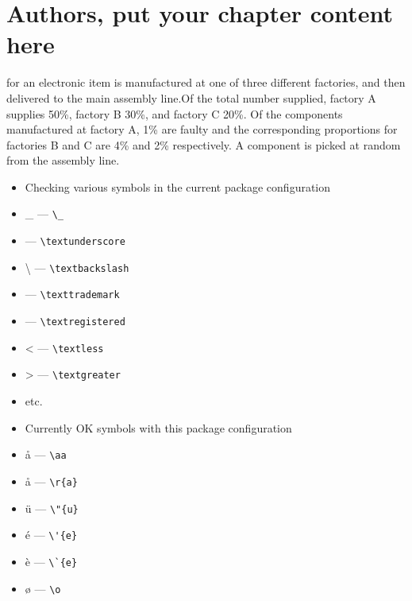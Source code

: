 %
%


\chapter[Authors, put your chapter content here]{Authors, put your chapter content here}


 for an electronic item is
manufactured at one of three different factories, and then delivered to
the main assembly line.Of the total number supplied, factory A supplies
50\%, factory B 30\%, and factory C 20\%. Of the components
manufactured at factory A, 1\% are faulty and the corresponding
proportions for factories B and C are 4\% and 2\% respectively. A
component is picked at random from the assembly line. 

\begin{itemize}

	\item Checking various symbols in the current package configuration
	\item \_ --- \verb|\_|
	\item \textunderscore{} --- \verb|\textunderscore|
	\item \textbackslash{} --- \verb|\textbackslash|
	\item \texttrademark{} --- \verb|\texttrademark|
	\item \textregistered{} --- \verb|\textregistered|
	\item \textless{} --- \verb|\textless|
	\item \textgreater{} --- \verb|\textgreater|
	\item etc.

	\item Currently OK symbols with this package configuration	
	\item \aa{} --- \verb|\aa|
	\item \r{a} --- \verb|\r{a}|
	\item \"{u} --- \verb|\"{u}|
	\item \'{e} --- \verb|\'{e}|
	\item \`{e} --- \verb|\`{e}|
	\item \o{}  --- \verb|\o|
\end{itemize}


